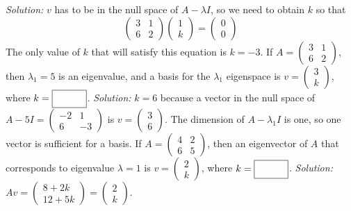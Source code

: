 \begin{parts}
        \ifnum {} {\color{DarkBlue} \textit{Solution:} $v$ has to be in the null space of $A - \lambda I$, so we need to obtain $k$ so that $$\begin{pmatrix} 3&1\\6&2\end{pmatrix}\begin{pmatrix} 1\\k \end{pmatrix} = \begin{pmatrix}0\\0 \end{pmatrix}$$ The only value of $k$ that will satisfy this equation is $k = -3$. } \fi    
    \fi 
    \ifnum {}
        If $A = \begin{pmatrix} 3&1\\6&2\end{pmatrix}$, then $\lambda_1=5$ is an eigenvalue, and a basis for the $\lambda_1$ eigenspace is $v = \begin{pmatrix} 3\\k\end{pmatrix}$, where $k = \framebox{\strut\hspace{1cm}}$. 
        \ifnum {} {\color{DarkBlue} \textit{Solution:} $k=6$ because a vector in the null space of $A-5I = \begin{pmatrix} -2&1\\6&-3\end{pmatrix}$ is $v = \begin{pmatrix}3\\6 \end{pmatrix}$. The dimension of $A-\lambda_1I$ is one, so one vector is sufficient for a basis.  } \fi    
    \fi 
    \ifnum {}
        If $A = \begin{pmatrix} 4&2\\6&5\end{pmatrix}$, then an eigenvector of $A$ that corresponds to eigenvalue $\lambda=1$ is $v = \begin{pmatrix} 2\\k\end{pmatrix}$, where $k = \framebox{\strut\hspace{1cm}}$.     
        \ifnum {} {\color{DarkBlue} \textit{Solution:} 
        $Av = \begin{pmatrix} 8+2k\\12+5k\end{pmatrix}
        =\begin{pmatrix} 2\\k\end{pmatrix}$. 
}
\end{parts}
